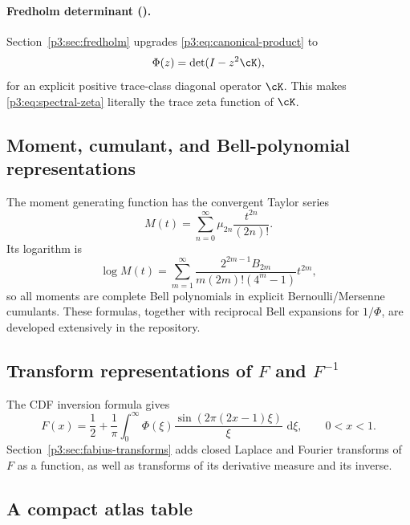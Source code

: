 \documentclass[11pt,oneside]{article}
\theoremstyle{definition}
\newcommand{\dd}{\,\mathrm d}
\begin{document}
\paragraph{Fredholm determinant (\statusnewPartl).}
Section~\ref{p3:sec:fredholm} upgrades \eqref{p3:eq:canonical-product} to
\begin{equation}
 \Phi(z)=\det(I-z^2\cK),                                    \label{p3:eq:fredholm-preview}
\end{equation}
for an explicit positive trace-class diagonal operator \(\cK\).  This makes
\eqref{p3:eq:spectral-zeta} literally the trace zeta function of \(\cK\).

\subsection{Moment, cumulant, and Bell-polynomial representations}

The moment generating function has the convergent Taylor series
\begin{equation}
 M(t)=\sum_{n=0}^{\infty}\mu_{2n}\frac{t^{2n}}{(2n)!}.       \label{p3:eq:M-moment-series}
\end{equation}
Its logarithm is
\begin{equation}
 \log M(t)=
 \sum_{m=1}^{\infty}
 \frac{2^{2m-1}B_{2m}}{m(2m)!(4^m-1)}t^{2m},                \label{p3:eq:M-cumulant}
\end{equation}
so all moments are complete Bell polynomials in explicit Bernoulli/Mersenne cumulants.
These formulas, together with reciprocal Bell expansions for \(1/\Phi\), are developed
extensively in the repository.

\subsection{Transform representations of \(F\) and \(F^{-1}\)}

The CDF inversion formula gives
\begin{equation}
 F(x)=\frac12+\frac1\pi\int_0^{\infty}
 \Phi(\xi)\frac{\sin(2\pi(2x-1)\xi)}{\xi}\,\dd\xi,
 \qquad 0<x<1.                                               \label{p3:eq:F-CDF-Fourier}
\end{equation}
Section~\ref{p3:sec:fabius-transforms} adds closed Laplace and Fourier transforms of \(F\) as
a function, as well as transforms of its derivative measure and its inverse.

\subsection{A compact atlas table}
\end{document}
